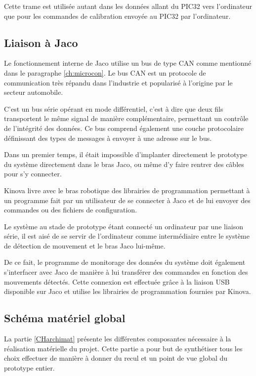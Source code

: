 \documentclass[letterpaper, twoside, 12pt, memoire, creativecommons, hyperref]{thETS}
\begin{document}
Cette trame est utilisée autant dans les données allant du PIC32 vers l'ordinateur que pour les commandes de calibration envoyée au PIC32 par l'ordinateur.

\subsection{Liaison à Jaco}

Le fonctionnement interne de Jaco utilise un bus de type CAN comme mentionné dans le paragraphe \ref{ch:microcon}. Le bus CAN est un protocole de communication très répandu dans l'industrie et popularisé à l'origine par le secteur automobile. 

C'est un bus série opérant en mode différentiel, c'est à dire que deux fils transportent le même signal de manière complémentaire, permettant un contrôle de l'intégrité des données. Ce bus comprend également une couche protocolaire définissant des types de messages à envoyer à une adresse sur le bus. 

Dans un premier temps, il était impossible d'implanter directement le prototype du système directement dans le bras Jaco, ou même d'y faire rentrer des câbles pour s'y connecter. 

Kinova livre avec le bras robotique des librairies de programmation permettant à un programme fait par un utilisateur de se connecter à Jaco et de lui envoyer des commandes ou des fichiers de configuration. 

Le système au stade de prototype étant connecté un ordinateur par une liaison série, il est aisé de se servir de l'ordinateur comme intermédiaire entre le système de détection de mouvement et le bras Jaco lui-même.

De ce fait, le programme de monitorage des données du système doit également s'interfacer avec Jaco de manière à lui transférer des commandes en fonction des mouvements détectés. Cette connexion est effectuée grâce à la liaison USB disponible sur Jaco et utilise les librairies de programmation fournies par Kinova.

\subsection{Schéma matériel global}

La partie \ref{CHarchimat} présente les différentes composantes nécessaire à la réalisation matérielle du projet. Cette partie a pour but de synthétiser tous les choix effectuer de manière à donner du recul et un point de vue global du prototype entier. 
\end{document}
